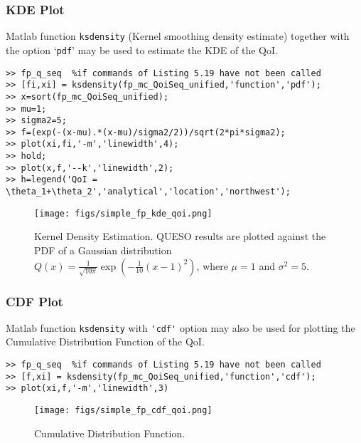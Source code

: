 \subsubsection{KDE Plot}

Matlab function \verb+ksdensity+ (Kernel smoothing density estimate) together with the option `\verb+pdf+' may be used to estimate the KDE of the QoI. 

\begin{lstlisting}[label=matlab:fp_kde_qoi,caption={Matlab code for the KDE displayed in Figure \ref{fig:simple_sfp_kde}}]
% inside Matlab
>> fp_q_seq  %if commands of Listing 5.19 have not been called
>> [fi,xi] = ksdensity(fp_mc_QoiSeq_unified,'function','pdf');
>> x=sort(fp_mc_QoiSeq_unified);
>> mu=1;
>> sigma2=5;
>> f=(exp(-(x-mu).*(x-mu)/sigma2/2))/sqrt(2*pi*sigma2);
>> plot(xi,fi,'-m','linewidth',4);
>> hold;
>> plot(x,f,'--k','linewidth',2);
>> h=legend('QoI = \theta_1+\theta_2','analytical','location','northwest');
\end{lstlisting}


\begin{figure}[htpb]
\centering 
\texttt{[image: figs/simple\_fp\_kde\_qoi.png]}
\vspace{-10pt}
\caption{Kernel Density Estimation. QUESO results are plotted against the PDF of a Gaussian distribution $Q(x)=   \frac{1}{ \sqrt{10\pi}} \exp\left(-\frac{1}{10}(x-1)^2 \right)$, where $\mu=1$ and $\sigma^2=5$.}
\label{fig:simple_sfp_kde}
\end{figure}


\subsubsection{CDF Plot}

Matlab function \verb+ksdensity+ with \verb+'cdf'+ option may also be used for plotting the Cumulative Distribution Function of the QoI.

\begin{lstlisting}[label=matlab:fp_cdf_qoi,caption={Matlab code for the QoI CDF plot displayed in Figure \ref{fig:simple_sfp_cdf}.}]
% inside Matlab
>> fp_q_seq  %if commands of Listing 5.19 have not been called
>> [f,xi] = ksdensity(fp_mc_QoiSeq_unified,'function','cdf');
>> plot(xi,f,'-m','linewidth',3)
\end{lstlisting}

\begin{figure}[htpb]
\centering 
\texttt{[image: figs/simple\_fp\_cdf\_qoi.png]}
\vspace*{-10pt}
\caption{Cumulative Distribution Function.}
\label{fig:simple_sfp_cdf}
\end{figure}
